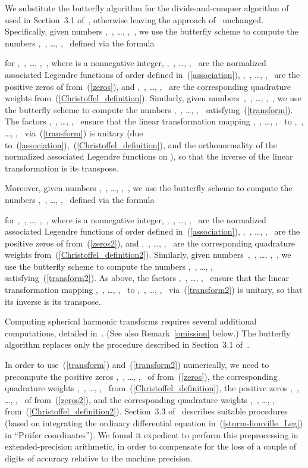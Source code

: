 \documentclass[final,3p,times]{elsarticle}
\begin{document}
We substitute the butterfly algorithm for the divide-and-conquer algorithm
of~\cite{gu-eisenstat95} used in Section~3.1 of~\cite{tygert_sph},
otherwise leaving the approach of~\cite{tygert_sph} unchanged. Specifically,
given numbers ,~, \dots, ,~,
we use the butterfly scheme to compute the numbers
,~, \dots, ,~ defined
via the formula

for ,~, \dots, ,~,
where  is a nonnegative integer,
,~, \dots,
,~
are the normalized associated Legendre functions of order  defined
in~(\ref{association}),
,~, \dots, ,~ are the positive zeros
of  from~(\ref{zeros}),
and ,~, \dots, ,~
are the corresponding quadrature weights from~(\ref{Christoffel_definition}).
Similarly,
given numbers~,~, \dots, ,~,
we use the butterfly scheme to compute the numbers
,~, \dots, ,~
satisfying~(\ref{transform}).
The factors ,~, \dots,
,~ ensure that the linear transformation
mapping ,~, \dots, ,~
to ,~, \dots, ,~
via~(\ref{transform}) is unitary
(due to~(\ref{association}),~(\ref{Christoffel_definition}),
and the orthonormality of the normalized associated Legendre functions
on ), so that the inverse of the linear transformation
is its transpose.

Moreover, given numbers
,~, \dots, ,~,
we use the butterfly scheme to compute the numbers
,~, \dots, ,~ defined via the formula

for ,~, \dots, ,~,
where  is a nonnegative integer,
,~, \dots,
,~
are the normalized associated Legendre functions of order  defined
in~(\ref{association}),
,~, \dots, ,~ are the positive zeros
of  from~(\ref{zeros2}),
and ,~, \dots, ,~
are the corresponding quadrature weights from~(\ref{Christoffel_definition2}).
Similarly,
given numbers~,~, \dots, ,~,
we use the butterfly scheme to compute the numbers
,~, \dots, ,~
satisfying~(\ref{transform2}).
As above, the factors ,~, \dots,
,~ ensure that
the linear transformation mapping
,~, \dots, ,~
to ,~, \dots, ,~
via~(\ref{transform2}) is unitary, so that its inverse is its transpose.

Computing spherical harmonic transforms requires
several additional computations, detailed in~\cite{tygert_sph}.
(See also Remark~\ref{omission} below.)
The butterfly algorithm replaces only the procedure described
in Section~3.1 of~\cite{tygert_sph}.

In order to use~(\ref{transform}) and~(\ref{transform2}) numerically,
we need to precompute the positive zeros
,~, \dots, ,~ 
of  from~(\ref{zeros}),
the corresponding quadrature weights
,~, \dots, ,~
from~(\ref{Christoffel_definition}),
the positive zeros ,~, \dots, ,~
of  from~(\ref{zeros2}),
and the corresponding quadrature weights
,~, \dots, ,~
from~(\ref{Christoffel_definition2}).
Section~3.3 of~\cite{tygert_sph} describes suitable procedures
(based on integrating the ordinary differential equation
in~(\ref{sturm-liouville_Leg}) in ``Pr\"ufer coordinates'').
We found it expedient to perform this preprocessing in extended-precision
arithmetic, in order to compensate for the loss of a couple of digits
of accuracy relative to the machine precision.
\end{document}
